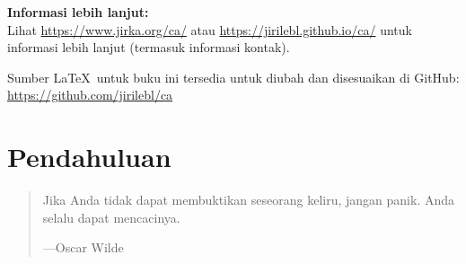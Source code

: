 \documentclass[12pt,openany]{book}
\newcommand{\ignore}[1]{}
\theoremstyle{plain}
\theoremstyle{remark}
\theoremstyle{definition}
\newenvironment{myepigraph}{%
    \begin{quote}%
    \begingroup\itshape
}{%
    \endgroup%
    \end{quote}
}
\theoremstyle{exercise}
\theoremstyle{example}
\begin{document}
\bigskip

\noindent
\textbf{Informasi lebih lanjut:}
\\
Lihat \url{https://www.jirka.org/ca/} atau \url{https://jirilebl.github.io/ca/}
untuk informasi lebih lanjut
(termasuk informasi kontak).


\medskip

\noindent
Sumber \LaTeX\ untuk buku ini tersedia
untuk diubah dan disesuaikan
di GitHub: \url{https://github.com/jirilebl/ca}



\tableofcontents
{}



\chapter*{Pendahuluan} \label{ch:intro}

\begin{myepigraph}
Jika Anda tidak dapat membuktikan seseorang keliru, jangan panik. Anda selalu dapat mencacinya.

---Oscar Wilde 
\end{myepigraph}
\end{document}
